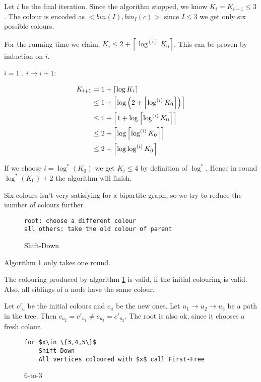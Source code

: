 \begin{pr} Let $i$ be the final iteration. Since the algorithm stopped, we know $K_i=K_{i-1} \leq 3$. The colour is encoded as $<bin(I), bin_I(c)>$ since $I\leq 3$ we get only six possible colours.

For the running time we claim: $K_i\leq 2+ \left\lceil \log^{(i)} K_0 \right\rceil$. This can be proven by induction on $i$. 

$i=1$ \ok. $i\rightarrow i+1$:

\begin{align*}
K_{i+1}&= 1+\left\lceil \log K_i \right\rceil\\
	&\leq 1+ \left\lceil \log\left(2+\left\lceil \log^{(i)}K_0 \right\rceil\right) \right\rceil\\
	&\leq 1+\left\lceil 1+\log \left\lceil \log^{(i)} K_0 \right\rceil \right\rceil\\
	&\leq 2+\left\lceil \log \left\lceil \log^{(i)} K_0 \right\rceil \right\rceil\\
	&\leq 2+\left\lceil \log \log^{(i)} K_0 \right\rceil\\
\end{align*}

If we choose $i=\log^*(K_0)$ we get $K_i\leq 4$ by definition of $\log^*$. Hence in round $\log^*(K_0)+2$ the algorithm will finish.
\end{pr}

Six colours isn't very satisfying for a bipartite graph, so we try to reduce the number of colours further.

\begin{figure}[hbt]
\begin{lstlisting}
root: choose a different colour
all others: take the old colour of parent
\end{lstlisting}
\caption{Shift-Down}
\label{alg:Shift-Down}
\end{figure}

Algorithm \ref{alg:Shift-Down} only takes one round.

\begin{lem} The colouring produced by algorithm \ref{alg:Shift-Down} is valid, if the initial colouring is valid. Also, all siblings of a node have the same colour.\end{lem}

\begin{pr} Let $c'_u$ be the initial colours and $c_u$ be the new ones. Let $u_1\rightarrow u_2 \rightarrow u_3$ be a path in the tree. Then $c_{u_2}=c'_{u_1} \neq c_{u_3}=c'_{u_2}$. The root is also ok, since it chooses a fresh colour.\end{pr}

\begin{figure}[hbt]
\begin{lstlisting}
for $x\in \{3,4,5\}$
	Shift-Down
	All vertices coloured with $x$ call First-Free
\end{lstlisting}
\caption{6-to-3}
\label{alg:6-to-3}
\end{figure}

